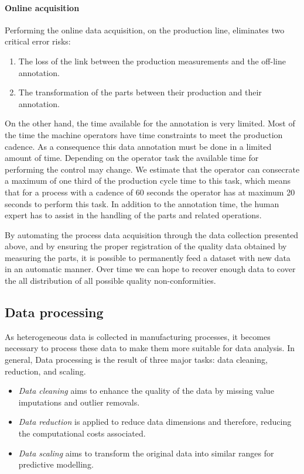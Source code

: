 \paragraph{Online acquisition}

Performing the online data acquisition, on the production line, eliminates two critical error risks:
\begin{enumerate}
    \item The loss of the link between the production measurements and the off-line annotation.
    \item The transformation of the parts between their production and their annotation.
\end{enumerate}

On the other hand, the time available for the annotation is very limited. Most of the time the machine operators have time constraints to meet the production cadence. As a consequence this data annotation must be done in a limited amount of time. Depending on the operator task the available time for performing the control may change. We estimate that the operator can consecrate a maximum of one third of the production cycle time to this task, which means that for a process with a cadence of 60 seconds the operator has at maximum 20 seconds to perform this task. In addition to the annotation time, the human expert has to assist in the handling of the parts and related operations.

By automating the process data acquisition through the data collection presented above, and by ensuring the proper registration of the quality data obtained by measuring the parts, it is possible to permanently feed a dataset with new data in an automatic manner. Over time we can hope to recover enough data to cover the all distribution of all possible quality non-conformities. 

\subsection{Data processing} \label{Data Processing}

As heterogeneous data is collected in manufacturing processes, it becomes necessary to process these data to make them more suitable for data analysis. In general, Data processing is the result of three major tasks: data cleaning, reduction, and scaling.

\begin{itemize}
    \item \textit{Data cleaning} aims to enhance the quality of the data by missing value imputations and outlier removals. 
    \item \textit{Data reduction} is applied to reduce data dimensions and therefore, reducing the computational costs associated. 
    \item \textit{Data scaling} aims to transform the original data into similar ranges for predictive modelling. 
\end{itemize}

